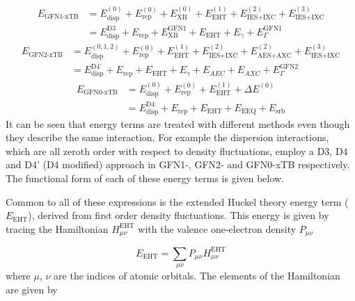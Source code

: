 \newcommand{\orderE}[2]{E^{\left(#1\right)}_{#2}}
\newcommand{\nameE}[2]{E^{#1}_{#2}}
\begin{equation}
\begin{aligned}
E_{\text{GFN1-xTB}} &= \orderE{0}{\text{disp}} + \orderE{0}{\text{rep}} + \orderE{0}{\text{XB}} + \orderE{1}{\text{EHT}} + \orderE{2}{\text{IES+IXC}} + \orderE{3}{\text{IES+IXC}} \\
&= \nameE{\text{D3}}{\text{disp}} + \nameE{}{\text{rep}} + \nameE{\text{GFN1}}{\text{XB}} + \nameE{}{\text{EHT}} + \nameE{}{\gamma} + \nameE{\text{GFN1}}{\Gamma}
\end{aligned}
\end{equation}
%
\begin{equation}
\begin{aligned}
E_{\text{GFN2-xTB}} &= \orderE{0,1,2}{\text{disp}} + \orderE{0}{\text{rep}} + \orderE{1}{\text{EHT}}  + \orderE{2}{\text{IES+IXC}} + \orderE{2}{\text{AES+AXC}} + \orderE{3}{\text{IES+IXC}} \\
&= \nameE{\text{D4'}}{\text{disp}} + \nameE{}{\text{rep}} + \nameE{}{\text{EHT}}  + \nameE{}{\gamma} + \nameE{}{AEC} + \nameE{}{AXC} + \nameE{\text{GFN2}}{\Gamma}
\end{aligned}
\end{equation}
%
\begin{equation}
\begin{aligned}
E_{\text{GFN0-xTB}} &= \orderE{0}{\text{disp}} + \orderE{0}{\text{rep}} + \orderE{1}{\text{EHT}}  + \Delta\orderE{0}{} \\
&= \nameE{\text{D4}}{\text{disp}} + \nameE{}{\text{rep}} + \nameE{}{\text{EHT}}  + \nameE{}{\text{EEQ}} + \nameE{}{\text{srb}}
\end{aligned}
\end{equation}
%
It can be seen that energy terms are treated with different methods even though 
they describe the same interaction. For example the dispersion interactions, which
are all zeroth order with respect to density fluctuations, employ a D3, D4 and D4'
(D4 modified) approach in GFN1-, GFN2- and GFN0-xTB respectively. The functional
form of each of these energy terms is given below.

Common to all of these expressions is the extended Huckel theory energy term ($\nameE{}{\text{EHT}}$),
derived from first order density fluctuations. This energy is given by tracing the
Hamiltonian $H_{\mu\nu}^{\text{EHT}}$ with the valence one-electron density $P_{\mu\nu}$

\begin{equation}
E_{\text{EHT}} = \sum_{\mu\nu} P_{\mu\nu} H_{\mu\nu}^{\text{EHT}}
\end{equation}
%
where $\mu$, $\nu$ are the indices of atomic orbitals. The elements of the Hamiltonian 
are given by 

